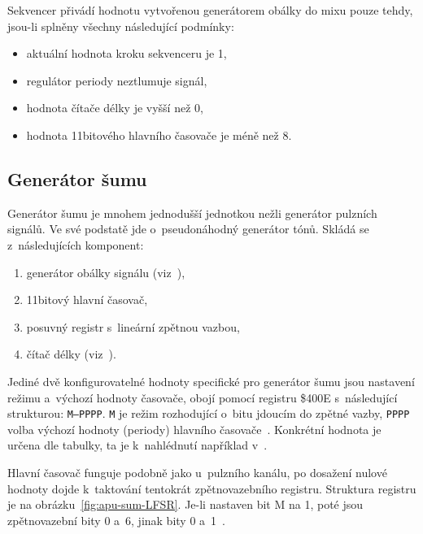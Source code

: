 Sekvencer přivádí hodnotu vytvořenou generátorem obálky do mixu pouze tehdy, jsou-li splněny všechny následující podmínky:
\begin{itemize}
	\item aktuální hodnota kroku sekvenceru je 1,
	\item regulátor periody neztlumuje signál,
	\item hodnota čítače délky je vyšší než 0,
	\item hodnota 11bitového hlavního časovače je méně než 8.
\end{itemize}

\subsection{Generátor šumu}
Generátor šumu je mnohem jednodušší jednotkou nežli generátor pulzních signálů. Ve své podstatě jde o~pseudonáhodný generátor tónů. Skládá se z~následujících komponent:
\begin{enumerate}
	\item generátor obálky signálu (viz~\cite{Nesdev:apu-envelope}),
	\item 11bitový hlavní časovač,
	\item posuvný registr s~lineární zpětnou vazbou,
	\item čítač délky (viz~\cite{Nesdev:apu-length-counter}).
\end{enumerate}

Jediné dvě konfigurovatelné hodnoty specifické pro generátor šumu jsou nastavení režimu a~výchozí hodnoty časovače, obojí pomocí registru \$400E s~následující strukturou: \texttt{M---PPPP}. \texttt{M} je režim rozhodující o~bitu jdoucím do zpětné vazby, \texttt{PPPP} volba výchozí hodnoty (periody) hlavního časovače~\cite{Nesdev:apu-noise}. Konkrétní hodnota je určena dle tabulky, ta je k~nahlédnutí například v~\cite{Nesdev:apu-noise}.

Hlavní časovač funguje podobně jako u~pulzního kanálu, po dosažení nulové hodnoty dojde k~taktování tentokrát zpětnovazebního registru. Struktura registru je na obrázku~\ref{fig:apu-sum-LFSR}. Je-li nastaven bit M na 1, poté jsou zpětnovazební bity 0 a~6, jinak bity 0 a~1~\cite{Nesdev:apu-noise}.

